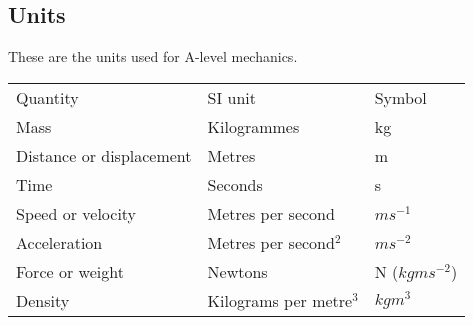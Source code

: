 \subsection{Units}
These are the units used for A-level mechanics.
\begin{table}[ht]
	\begin{tabular}{lll}
		Quantity                 & SI unit                 & Symbol                    \\
		Mass                     & Kilogrammes             & kg                        \\
		Distance or displacement & Metres                  & m                         \\
		Time                     & Seconds                 & s                         \\
		Speed or velocity        & Metres per second       & $ms^{-1}$                 \\
		Acceleration             & Metres per second$^2$   & $ms^{-2}$                 \\
		Force or weight          & Newtons                 & N ($kgms^{-2}$) \\
		Density                  & Kilograms per metre$^3$ & $kgm^3$                  
	\end{tabular}
\end{table}


